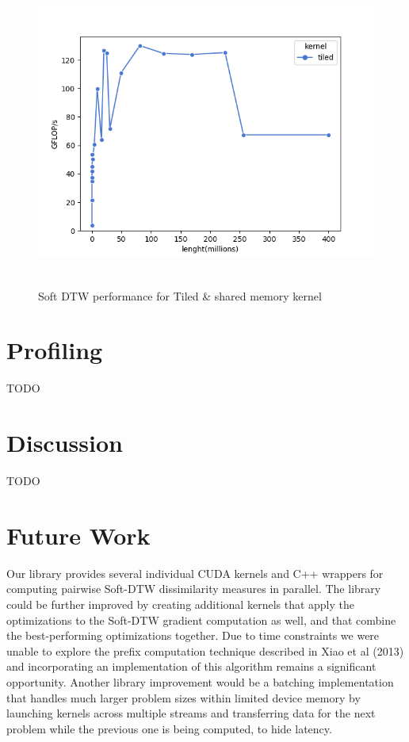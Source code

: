 \documentclass[12pt, letterpaper]{article}
\begin{document}
\begin{figure}[htbp]
\includegraphics[height=4in]{fig/plot_tiled.png}
\centering
\caption{Soft DTW performance for Tiled \& shared memory kernel}
\label{plot_tiled}
\end{figure}


\FloatBarrier
\section{Profiling}

TODO



\section{Discussion}

TODO

\section{Future Work}

Our library provides several individual CUDA kernels and C++ wrappers for
computing pairwise Soft-DTW dissimilarity measures in parallel. The library
could be further improved by creating additional kernels that apply the
optimizations to the Soft-DTW gradient computation as well, and that combine the
best-performing optimizations together. Due to time constraints we were unable
to explore the prefix computation technique described in Xiao et al (2013)
\cite{xiao_parallelizing_2013} and incorporating an implementation of this
algorithm remains a significant opportunity. Another library improvement would
be a batching implementation that handles much larger problem sizes within
limited device memory by launching kernels across multiple streams and
transferring data for the next problem while the previous one is being computed,
to hide latency.
\end{document}
